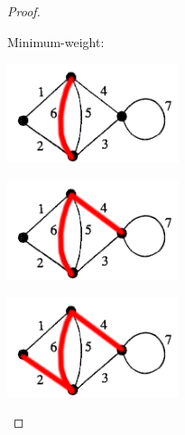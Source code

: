 \begin{proof}
\begin{enumerate}
            Minimum-weight:\pn
            
            \begin{center}
                \includegraphics[width=5cm]{Test1/Problem14/Fig-ii-a-1.png}
            \end{center}
            
            \begin{center}
                \includegraphics[width=5cm]{Test1/Problem14/Fig-ii-a-2.png}
            \end{center}
            
            \begin{center}
                \includegraphics[width=5cm]{Test1/Problem14/Fig-ii-a-3.png}
            \end{center}
\end{enumerate}
\end{proof}
